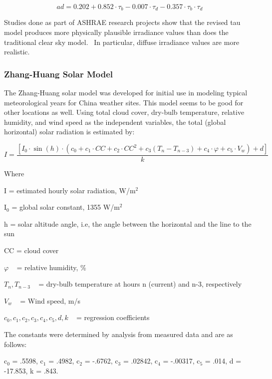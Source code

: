 \begin{equation}
ad = 0.202 + 0.852 \cdot {\tau_b} - 0.007 \cdot {\tau_d} - 0.357 \cdot {\tau_b} \cdot {\tau_d}
\end{equation}

Studies done as part of ASHRAE research projects show that the revised tau model produces more physically plausible irradiance values than does the traditional clear sky model.~ In particular, diffuse irradiance values are more realistic.

\subsubsection{Zhang-Huang Solar Model}\label{zhang-huang-solar-model}

The Zhang-Huang solar model was developed for initial use in modeling typical meteorological years for China weather sites. This model seems to be good for other locations as well. Using total cloud cover, dry-bulb temperature, relative humidity, and wind speed as the independent variables, the total (global horizontal) solar radiation is estimated by:

\begin{equation}
I = \frac{{\left[ {{I_0}\cdot \sin (h)\cdot \left( {{c_0} + {c_1}\cdot CC + {c_2}\cdot C{C^2} + {c_3}\left( {{T_n} - {T_{n - 3}}} \right) + {c_4}\cdot \varphi  + {c_5}\cdot {V_w}} \right) + d} \right]}}{k}
\end{equation}

Where

I = estimated hourly solar radiation, W/m\(^{2}\)

I\(_{0}\) = global solar constant, 1355 W/m\(^{2}\)

h = solar altitude angle, i.e, the angle between the horizontal and the line to the sun

CC = cloud cover

\(\varphi\) ~ = relative humidity, \%

\({T_n},{T_{n - 3}}\) ~ = dry-bulb temperature at hours n (current) and n-3, respectively

\({V_w}\) ~ = Wind speed, m/s

\({c_0},{c_1},{c_2},{c_3},{c_4},{c_5},d,k\) ~ = regression coefficients

The constants were determined by analysis from measured data and are as follows:

c\(_{0}\) = .5598, c\(_{1}\) = .4982, c\(_{2}\) = -.6762, c\(_{3}\) = .02842, c\(_{4}\) = -.00317, c\(_{5}\) = .014, d = -17.853, k = .843.

